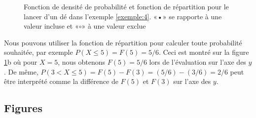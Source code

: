 \begin{example}
\begin{figure}%
\centering
{}%
\qquad
{}%
\caption{Fonction de densité de probabilité et fonction de répartition pour
le lancer d'un dé dans l'exemple \ref{exemple:4}. «•» se rapporte à une valeur incluse et «$\circ$» à une valeur exclue}%
\label{fig:exemple4}%
\end{figure}

\end{example}

Nous pouvons utiliser la fonction de répartition pour calculer toute probabilité souhaitée, par exemple
$P (X ≤ 5) = F (5) = 5/6$. Ceci est montré sur la figure \ref{fig:exemple4}b où pour $X = 5$, nous obtenons
$F (5) = 5/6$ lors de l'évaluation sur l'axe des $y$. De même, $P (3 <X ≤ 5) = F (5) - F (3) = (5/6) - (3/6) = 2/6$
peut être interprété comme la différence de $F (5)$ et $F ( 3) $ sur l'axe des $y$.






\subsection{Figures}

